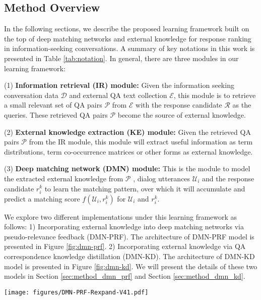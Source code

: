 \subsection{Method Overview}
 In the following sections, we describe the proposed learning framework built on the top of deep matching networks and external knowledge for response ranking in information-seeking conversations. A summary of key notations in this work is presented in Table \ref{tab:notation}. In general, there are three modules in our learning framework:
 
 (1) \textbf{Information retrieval (IR) module:} Given the information seeking conversation data $\mathcal{D}$ and external QA text collection $\mathcal{E}$, this module is to retrieve a small relevant set of QA pairs $\mathcal{P}$ from $\mathcal{E}$ with the response candidate $\mathcal{R}$ as the queries. These retrieved QA pairs $\mathcal{P}$ become the source of external knowledge. %
 	
 (2) \textbf{External knowledge extraction (KE) module:} Given the retrieved QA pairs $\mathcal{P}$  from the IR module, this module will extract useful information as term distributions, term co-occurrence matrices or other forms as external knowledge.
 	
 (3) \textbf{Deep matching network (DMN) module:} This is the module to model the extracted external knowledge from $\mathcal{P}$ , dialog utterances $ \mathcal{U}_i$ and the response candidate $ r_i^k$ to learn the matching pattern, over which it will accumulate and predict a matching score $f( \mathcal{U}_i, r_i^k ) $ for $ \mathcal{U}_i$ and $ r_i^k$. %
 
 We explore two different implementations under this learning framework as follows: 1) Incorporating external knowledge into deep matching networks via pseudo-relevance feedback (DMN-PRF). The architecture of DMN-PRF model is presented in Figure \ref{fig:dmn-prf}. 2) Incorporating external knowledge via QA correspondence knowledge distillation (DMN-KD). The architecture of DMN-KD model is presented in Figure \ref{fig:dmn-kd}. We will present the details of these two models in Section \ref{sec:method_dmn_prf} and Section \ref{sec:method_dmn_kd}.
 
 
 \begin{figure*}[th]
 	\center
 	\texttt{[image: figures/DMN-PRF-Rexpand-V41.pdf]}
 	\vspace{-0.4cm}
 	\caption{The architecture of DMN-PRF model for conversation response ranking.}\label{fig:dmn-prf}
 \end{figure*}

